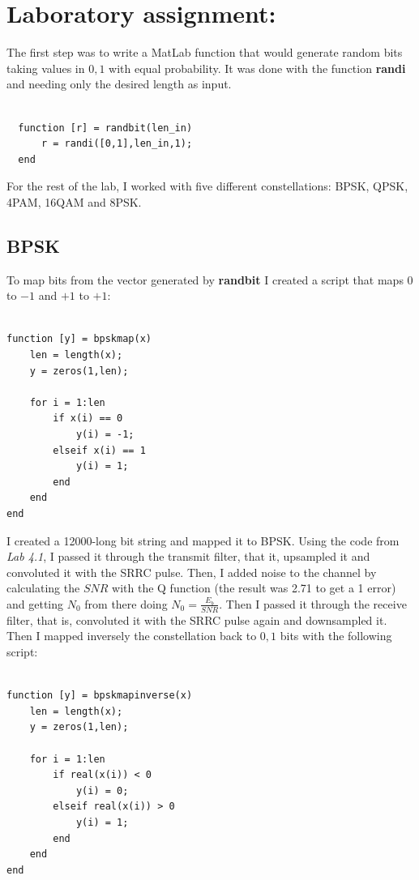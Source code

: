 \documentclass[a4paper,11pt]{article}
\begin{document}
\section{Laboratory assignment:}

The first step was to write a MatLab function that would generate random bits
taking values in ${0,1}$ with equal probability. It was done with the function
\textbf{randi} and needing only the desired length as input.

\bigskip
\begin{lstlisting}

  function [r] = randbit(len_in)
      r = randi([0,1],len_in,1);
  end

\end{lstlisting}
\bigskip

For the rest of the lab, I worked with five different constellations: BPSK,
QPSK, 4PAM, 16QAM and 8PSK.

\subsection{BPSK}

To map bits from the vector generated by \textbf{randbit} I created a script
that maps $0$ to $-1$ and $+1$ to $+1$:

\bigskip
\begin{lstlisting}

function [y] = bpskmap(x)
    len = length(x);
    y = zeros(1,len);

    for i = 1:len
        if x(i) == 0
            y(i) = -1;
        elseif x(i) == 1
            y(i) = 1;
        end
    end
end

\end{lstlisting}
\bigskip

I created a 12000-long bit string and mapped it to BPSK. Using the code from
\textit{Lab 4.1}, I passed it through the transmit filter, that it, upsampled
it and convoluted it with the SRRC pulse. Then, I added noise to the channel
by calculating the $SNR$ with the Q function (the result was 2.71 to get a 1%
error) and getting $N_0$ from there doing $N_0 = \displaystyle\frac{E_b}{SNR}$.
Then I passed it through the receive filter, that is, convoluted it with the
SRRC pulse again and downsampled it. Then I mapped inversely the constellation
back to ${0,1}$ bits with the following script:

\bigskip
\begin{lstlisting}

function [y] = bpskmapinverse(x)
    len = length(x);
    y = zeros(1,len);

    for i = 1:len
        if real(x(i)) < 0
            y(i) = 0;
        elseif real(x(i)) > 0
            y(i) = 1;
        end
    end
end

\end{lstlisting}
\bigskip
\end{document}

